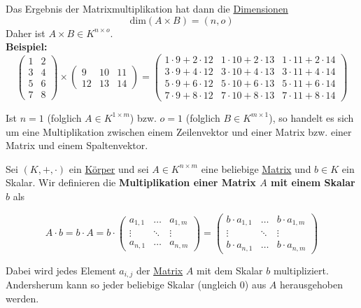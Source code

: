 \documentclass[../../main.tex]{subfiles}
\begin{document}
\begin{definition}[Matrixmultiplikation]
		Das Ergebnis der Matrixmultiplikation hat dann die \hyperref[def:DimensionMatrix]{Dimensionen} $$\textrm{dim}(A \times B) = (n,o)$$
		Daher ist $A \times B \in K^{n \times o}$. \\
		
	
		\textbf{Beispiel:}		
		$$
		\begin{pmatrix} 1 & 2 \\ 3 & 4 \\ 5 & 6 \\ 7 & 8\end{pmatrix} 
		\times 
		\begin{pmatrix} 9 & 10 & 11 \\ 12 & 13 & 14\end{pmatrix}
		=
		\begin{pmatrix} 
		1 \cdot 9 + 2 \cdot 12 & 1 \cdot 10 + 2 \cdot 13  & 1 \cdot 11 + 2 \cdot 14 \\ 
		3 \cdot 9 + 4 \cdot 12 & 3 \cdot 10 + 4 \cdot 13  & 3 \cdot 11 + 4 \cdot 14 \\
		5 \cdot 9 + 6 \cdot 12 & 5 \cdot 10 + 6 \cdot 13  & 5 \cdot 11 + 6 \cdot 14 \\
		7 \cdot 9 + 8 \cdot 12 & 7 \cdot 10 + 8 \cdot 13  & 7 \cdot 11 + 8 \cdot 14
		\end{pmatrix}
		$$
		
		Ist $n=1$ (folglich $A \in K^{1 \times m}$) bzw. $o=1$ (folglich $B \in K^{m \times 1}$), so handelt es sich um eine Multiplikation zwischen einem Zeilenvektor und einer Matrix bzw. einer Matrix und einem Spaltenvektor.
		
	\end{definition}
	
	\begin{definition}
		Sei $(K,+,\cdot)$ ein \hyperref[def:Körper]{Körper} und sei $A\in K^{n \times m}$ eine beliebige \hyperref[def:Matrix]{Matrix} und $b \in K$ ein Skalar. Wir definieren die \textbf{Multiplikation einer Matrix $A$ mit einem Skalar $b$} als 
		
		$$A \cdot b = b \cdot A = b \cdot \begin{pmatrix} a_{1,1} & \dots & a_{1,m} \\ \vdots & \ddots & \vdots \\ a_{n,1} & \dots & a_{n,m} \end{pmatrix} = \begin{pmatrix} b \cdot a_{1,1} & \dots & b \cdot a_{1,m} \\ \vdots & \ddots & \vdots \\ b \cdot a_{n,1} & \dots & b \cdot a_{n,m} \end{pmatrix}$$
		
		Dabei wird jedes Element $a_{i,j}$ der \hyperref[def:Matrix]{Matrix} $A$ mit dem Skalar $b$ multipliziert. Andersherum kann so jeder beliebige Skalar (ungleich 0) aus $A$ herausgehoben werden. 
	\end{definition}
\end{document}
